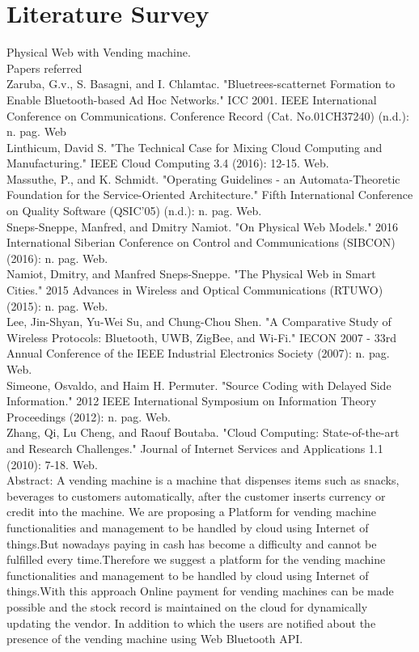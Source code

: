 \documentclass[oneside,a4paper,12pt]{report}
\begin{document}
\section{Literature Survey}
 Physical Web with Vending machine.\\
Papers referred\\
Zaruba, G.v., S. Basagni, and I. Chlamtac. "Bluetrees-scatternet Formation to Enable Bluetooth-based Ad Hoc Networks." ICC 2001. IEEE International Conference on Communications. Conference Record (Cat. No.01CH37240) (n.d.): n. pag. Web\\
Linthicum, David S. "The Technical Case for Mixing Cloud Computing and Manufacturing." IEEE Cloud Computing 3.4 (2016): 12-15. Web.\\
Massuthe, P., and K. Schmidt. "Operating Guidelines - an Automata-Theoretic Foundation for the Service-Oriented Architecture." Fifth International Conference on Quality Software (QSIC'05) (n.d.): n. pag. Web.\\
Sneps-Sneppe, Manfred, and Dmitry Namiot. "On Physical Web Models." 2016 International Siberian Conference on Control and Communications (SIBCON) (2016): n. pag. Web.\\
Namiot, Dmitry, and Manfred Sneps-Sneppe. "The Physical Web in Smart Cities." 2015 Advances in Wireless and Optical Communications (RTUWO) (2015): n. pag. Web.\\
Lee, Jin-Shyan, Yu-Wei Su, and Chung-Chou Shen. "A Comparative Study of Wireless Protocols: Bluetooth, UWB, ZigBee, and Wi-Fi." IECON 2007 - 33rd Annual Conference of the IEEE Industrial Electronics Society (2007): n. pag. Web.\\
Simeone, Osvaldo, and Haim H. Permuter. "Source Coding with Delayed Side Information." 2012 IEEE International Symposium on Information Theory Proceedings (2012): n. pag. Web.\\
Zhang, Qi, Lu Cheng, and Raouf Boutaba. "Cloud Computing: State-of-the-art and Research Challenges." Journal of Internet Services and Applications 1.1 (2010): 7-18. Web.\\
Abstract:
A vending machine is a machine that dispenses items such  as snacks, beverages to customers automatically, after the customer inserts currency or credit into the machine. We are proposing a Platform for vending machine functionalities and management to be  handled by cloud using Internet of things.But nowadays paying in cash has become a difficulty and cannot be fulfilled every time.Therefore we suggest a platform for the vending machine functionalities and management to be  handled by cloud using Internet of things.With this approach Online payment for vending machines can be made possible and the stock record is maintained on the cloud for dynamically updating the vendor. In addition to which the users are notified about the presence of the vending machine using Web Bluetooth API.
\end{document}
